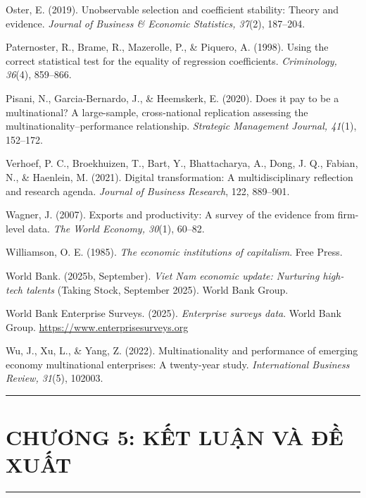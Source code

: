 \documentclass[
  a4paper,
  13pt]{extreport}
\begin{document}
Oster, E. (2019). Unobservable selection and coefficient stability:
Theory and evidence. \emph{Journal of Business \& Economic Statistics,
37}(2), 187--204.

Paternoster, R., Brame, R., Mazerolle, P., \& Piquero, A. (1998). Using
the correct statistical test for the equality of regression
coefficients. \emph{Criminology, 36}(4), 859--866.

Pisani, N., Garcia-Bernardo, J., \& Heemskerk, E. (2020). Does it pay to
be a multinational? A large-sample, cross-national replication assessing
the multinationality--performance relationship. \emph{Strategic
Management Journal, 41}(1), 152--172.

Verhoef, P. C., Broekhuizen, T., Bart, Y., Bhattacharya, A., Dong, J.
Q., Fabian, N., \& Haenlein, M. (2021). Digital transformation: A
multidisciplinary reflection and research agenda. \emph{Journal of
Business Research}, 122, 889--901.

Wagner, J. (2007). Exports and productivity: A survey of the evidence
from firm-level data. \emph{The World Economy, 30}(1), 60--82.

Williamson, O. E. (1985). \emph{The economic institutions of
capitalism}. Free Press.

World Bank. (2025b, September). \emph{Viet Nam economic update:
Nurturing high-tech talents} (Taking Stock, September 2025). World Bank
Group.

World Bank Enterprise Surveys. (2025). \emph{Enterprise surveys data}.
World Bank Group. \url{https://www.enterprisesurveys.org}

Wu, J., Xu, L., \& Yang, Z. (2022). Multinationality and performance of
emerging economy multinational enterprises: A twenty-year study.
\emph{International Business Review, 31}(5), 102003.

\begin{center}\rule{0.5\linewidth}{0.5pt}\end{center}

\newpage

\hypertarget{chux1b0ux1a1ng-5-kux1ebft-luux1eadn-vuxe0-ux111ux1ec1-xuux1ea5t}{%
\chapter{CHƯƠNG 5: KẾT LUẬN VÀ ĐỀ
XUẤT}\label{chux1b0ux1a1ng-5-kux1ebft-luux1eadn-vuxe0-ux111ux1ec1-xuux1ea5t}}

\begin{center}\rule{0.5\linewidth}{0.5pt}\end{center}
\end{document}
